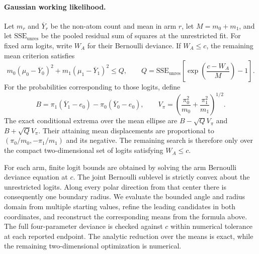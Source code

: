 \documentclass[11pt]{article}
\begin{document}
\paragraph{Gaussian working likelihood.}
Let $m_r$ and $\overline{Y}_r$ be the non-atom count and mean in arm $r$, let $M=m_0+m_1$, and let $\mathrm{SSE}_{\mathrm{unres}}$ be the pooled residual sum of squares at the unrestricted fit. For fixed arm logits, write $W_A$ for their Bernoulli deviance. If $W_A\leq c$, the remaining mean criterion satisfies
\[
  m_0(\mu_0-\overline{Y}_0)^2
  +m_1(\mu_1-\overline{Y}_1)^2
  \leq
  Q,
  \qquad
  Q=\mathrm{SSE}_{\mathrm{unres}}\left[\exp\left(\frac{c-W_A}{M}\right)-1\right].
\]
For the probabilities corresponding to those logits, define
\[
  B=\pi_1(\overline{Y}_1-e_0)-\pi_0(\overline{Y}_0-e_0),
  \qquad
  V_\pi=\left(\frac{\pi_0^2}{m_0}+\frac{\pi_1^2}{m_1}\right)^{1/2}.
\]
The exact conditional extrema over the mean ellipse are $B-\sqrt Q V_\pi$ and $B+\sqrt Q V_\pi$. Their attaining mean displacements are proportional to $(\pi_0/m_0,-\pi_1/m_1)$ and its negative. The remaining search is therefore only over the compact two-dimensional set of logits satisfying $W_A\leq c$.

For each arm, finite logit bounds are obtained by solving the arm Bernoulli deviance equation at $c$. The joint Bernoulli sublevel is strictly convex about the unrestricted logits. Along every polar direction from that center there is consequently one boundary radius. We evaluate the bounded angle and radius domain from multiple starting values, refine the leading candidates in both coordinates, and reconstruct the corresponding means from the formula above. The full four-parameter deviance is checked against $c$ within numerical tolerance at each reported endpoint. The analytic reduction over the means is exact, while the remaining two-dimensional optimization is numerical.
\end{document}
